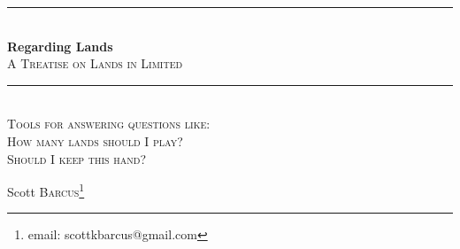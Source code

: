 \documentclass[oneside]{book}   %
\begin{document}
 
\frontmatter

\begin{titlepage} %
	\newcommand{\HRule}{\rule{\linewidth}{0.5mm}} %
	
	\center %
	

	
	\HRule\\[0.4cm]
	
	{\huge\bfseries Regarding Lands}\\[0.4cm] %
	\textsc{\Large A Treatise on Lands in Limited}
	\HRule\\[1.5cm]
	
	
	\textsc{\LARGE Tools for answering questions like:}\\[1.cm] %
	
	\textsc{\Large How many lands should I play?}\\[0.5cm] %
	
	\textsc{\Large Should I keep this hand?}\\[1.5cm] %
	
	\begin{minipage}{0.5\textwidth}
		\begin{center}
			\large
			Scott \textsc{Barcus}\footnote{email: scottkbarcus@gmail.com} \newline
		\end{center}
	\end{minipage}
	
	
	
	

\end{titlepage}
\end{document}
